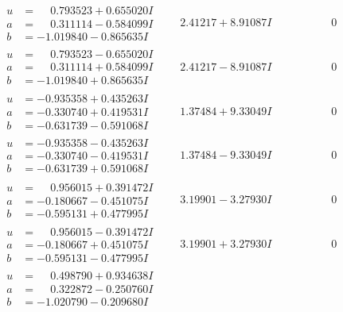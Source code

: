 \documentclass[1p]{elsarticle_modified}
\theoremstyle{definition}
\begin{document}
$$\begin{array}{c|c|c}
\begin{aligned}
u &= \phantom{-}0.793523 + 0.655020 I \\
a &= \phantom{-}0.311114 - 0.584099 I \\
b &= -1.019840 - 0.865635 I\end{aligned}
 & \phantom{-}2.41217 + 8.91087 I & \phantom{-0.000000 } 0 \\ \hline\begin{aligned}
u &= \phantom{-}0.793523 - 0.655020 I \\
a &= \phantom{-}0.311114 + 0.584099 I \\
b &= -1.019840 + 0.865635 I\end{aligned}
 & \phantom{-}2.41217 - 8.91087 I & \phantom{-0.000000 } 0 \\ \hline\begin{aligned}
u &= -0.935358 + 0.435263 I \\
a &= -0.330740 + 0.419531 I \\
b &= -0.631739 - 0.591068 I\end{aligned}
 & \phantom{-}1.37484 + 9.33049 I & \phantom{-0.000000 } 0 \\ \hline\begin{aligned}
u &= -0.935358 - 0.435263 I \\
a &= -0.330740 - 0.419531 I \\
b &= -0.631739 + 0.591068 I\end{aligned}
 & \phantom{-}1.37484 - 9.33049 I & \phantom{-0.000000 } 0 \\ \hline\begin{aligned}
u &= \phantom{-}0.956015 + 0.391472 I \\
a &= -0.180667 - 0.451075 I \\
b &= -0.595131 + 0.477995 I\end{aligned}
 & \phantom{-}3.19901 - 3.27930 I & \phantom{-0.000000 } 0 \\ \hline\begin{aligned}
u &= \phantom{-}0.956015 - 0.391472 I \\
a &= -0.180667 + 0.451075 I \\
b &= -0.595131 - 0.477995 I\end{aligned}
 & \phantom{-}3.19901 + 3.27930 I & \phantom{-0.000000 } 0 \\ \hline\begin{aligned}
u &= \phantom{-}0.498790 + 0.934638 I \\
a &= \phantom{-}0.322872 - 0.250760 I \\
b &= -1.020790 - 0.209680 I\end{aligned}

\end{array}$$
\end{document}
